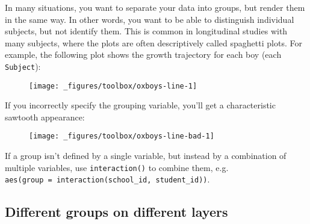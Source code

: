In many situations, you want to separate your data into groups, but
render them in the same way. In other words, you want to be able to
distinguish individual subjects, but not identify them. This is common
in longitudinal studies with many subjects, where the plots are often
descriptively called spaghetti plots. For example, the following plot
shows the growth trajectory for each boy (each \texttt{Subject}):
 

\begin{Shaded}
\begin{Highlighting}[]
 \StringTok{ }
\StringTok{  }\NormalTok{() +}\StringTok{ }
\StringTok{  }\NormalTok{()}
\end{Highlighting}
\end{Shaded}

\begin{figure}[H]
  \centering
  \texttt{[image: \_figures/toolbox/oxboys-line-1]}
\end{figure}

If you incorrectly specify the grouping variable, you'll get a
characteristic sawtooth appearance:

\begin{Shaded}
\begin{Highlighting}[]
\StringTok{ }
\StringTok{  }\NormalTok{() +}\StringTok{ }
\StringTok{  }\NormalTok{()}
\end{Highlighting}
\end{Shaded}

\begin{figure}[H]
  \centering
  \texttt{[image: \_figures/toolbox/oxboys-line-bad-1]}
\end{figure}

If a group isn't defined by a single variable, but instead by a
combination of multiple variables, use \texttt{interaction()} to combine
them, e.g.
\texttt{aes(group\ =\ interaction(school\_id,\ student\_id))}.

\subsection{Different groups on different layers}

